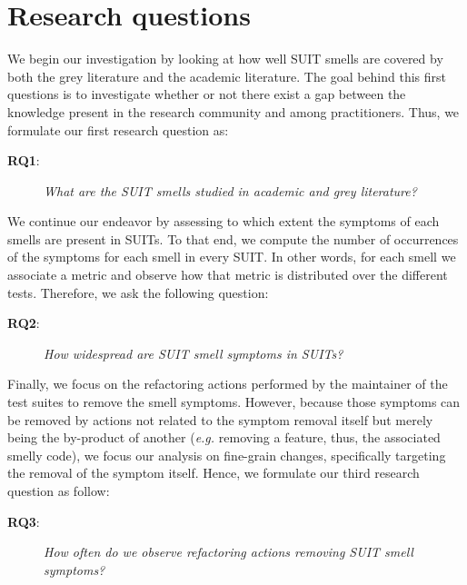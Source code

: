 \section{Research questions}


We begin our investigation by looking at how well SUIT smells are covered by both the grey literature and the academic literature. The goal behind this first questions is to investigate whether or not there exist a gap between the knowledge present in the research community and among practitioners. Thus, we formulate our first research question as:

\begin{description} 
\item[\textbf{RQ1}:]
\emph{What are the SUIT smells studied in academic and grey literature?} 
\end{description} 

We continue our endeavor by assessing to which extent the symptoms of each smells are present in SUITs. To that end, we compute the number of occurrences of the symptoms for each smell in every SUIT. In other words, for each smell we associate a metric and observe how that metric is distributed over the different tests. Therefore, we ask the following question:

\begin{description} 
\item[\textbf{RQ2}:]
\emph{How widespread are SUIT smell symptoms in SUITs?} 
\end{description} 

Finally, we focus on the refactoring actions performed by the maintainer of the test suites to remove the smell symptoms. However, because those symptoms can be removed by actions not related to the symptom removal itself but merely being the by-product of another (\emph{e.g.} removing a feature, thus, the associated smelly code), we focus our analysis on fine-grain changes, specifically targeting the removal of the symptom itself. Hence, we formulate our third research question as follow:

\begin{description} 
\item[\textbf{RQ3}:]
\emph{How often do we observe refactoring actions removing SUIT smell symptoms?} 
\end{description} 